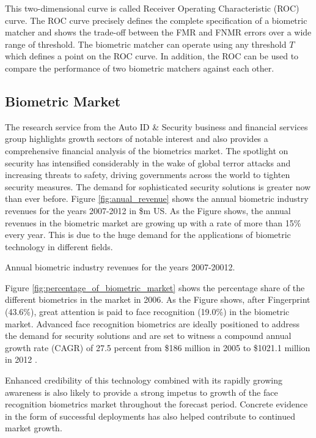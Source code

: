 This two-dimensional curve is called Receiver Operating
Characteristic (ROC) curve. The ROC curve precisely defines the
complete specification of a biometric matcher and shows the
trade-off between the FMR and FNMR errors over a wide range of
threshold. The biometric matcher can operate using any threshold $T$
which defines a point on the ROC curve. In addition, the ROC can be
used to compare the performance of two biometric matchers against
each other. \ei
\subsection{Biometric Market}
The research service from the Auto ID \& Security business and
financial services group highlights growth sectors of notable
interest and also provides a comprehensive financial analysis of the
biometrics market.  The spotlight on security has intensified
considerably in the wake of global terror attacks and increasing
threats to safety, driving governments across the world to tighten
security measures. The demand for sophisticated security solutions
is greater now than ever before. Figure \ref{fig:anual_revenue}
shows the annual biometric industry revenues for the years 2007-2012
in \$m US. As the Figure shows, the annual revenues in the biometric
market are growing up with a rate of more than 15\% every year. This
is due to the huge demand for the applications of biometric
technology in different fields.

\bfig {} \caption{Annual biometric industry revenues for the years
2007-20012.} \label{fig:anual_revenue}\efig

Figure \ref{fig:percentage_of_biometric_market} shows the percentage
share of the different biometrics in the market in 2006. As the
Figure shows, after Fingerprint (43.6\%), great attention is paid to
face recognition (19.0\%) in the biometric market. Advanced face
recognition biometrics are ideally positioned to address the demand
for security solutions and are set to witness a compound annual
growth rate (CAGR) of 27.5 percent from \$186 million in 2005 to
\$1021.1 million in 2012 \cite{frost06}.

Enhanced credibility of this technology combined with its rapidly
growing awareness is also likely to provide a strong impetus to
growth of the face recognition biometrics market throughout the
forecast period. Concrete evidence in the form of successful
deployments has also helped contribute to continued market growth.

